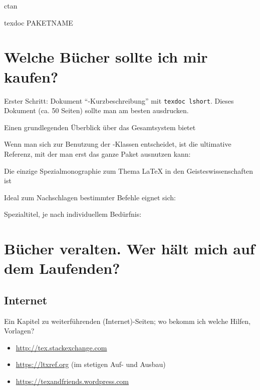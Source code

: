 
ctan


texdoc PAKETNAME


\section{Welche Bücher sollte ich mir kaufen?}

Erster Schritt: Dokument \enquote{\LaTeXe -Kurzbeschreibung} mit 
\lstinline/texdoc lshort/. Dieses Dokument (ca. 50 Seiten) sollte man am besten ausdrucken.

Einen grundlegenden Überblick über das Gesamtsystem bietet
\cite{voss:einfuehrung}

Wenn man sich zur Benutzung der \KOMAScript -Klassen entscheidet, ist die ultimative Referenz,
mit der man erst das ganze Paket ausnutzen kann:
\cite{kohm:2014}

Die einzige Spezialmonographie zum Thema \LaTeX{} in den Geisteswissenschaften ist
\cite{rouquette:2012}

Ideal zum Nachschlagen bestimmter Befehle eignet sich:
\cite{voss:referenz}

Spezialtitel, je nach individuellem Bedürfnis:

\cite{voss:praesentationen}

\cite{voss:bibliografien}

\cite{voss:pstricks}


\section{Bücher veralten. Wer hält mich auf dem Laufenden?}

\subsection{Internet}
Ein Kapitel zu weiterführenden (Internet)-Seiten; wo bekomm ich welche Hilfen, Vorlagen?

\begin{itemize}
    \item \url{http://tex.stackexchange.com}
    \item \url{https://ltxref.org} (im stetigen Auf- und Ausbau)
\end{itemize}


\begin{itemize}
    \item \url{https://texandfriends.wordpress.com}
\end{itemize}

